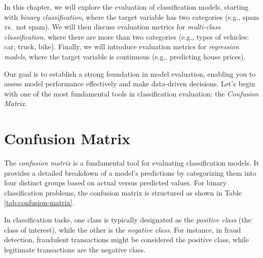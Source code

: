 \documentclass[
  11pt,
]{book}
\theoremstyle{definition}
\theoremstyle{definition}
\theoremstyle{definition}
\theoremstyle{definition}
\theoremstyle{remark}
\begin{document}
In this chapter, we will explore the evaluation of classification models, starting with \emph{binary classification}, where the target variable has two categories (e.g., spam vs.~not spam). We will then discuss evaluation metrics for \emph{multi-class classification}, where there are more than two categories (e.g., types of vehicles: car, truck, bike). Finally, we will introduce evaluation metrics for \emph{regression models}, where the target variable is continuous (e.g., predicting house prices).

Our goal is to establish a strong foundation in model evaluation, enabling you to assess model performance effectively and make data-driven decisions. Let's begin with one of the most fundamental tools in classification evaluation: the \emph{Confusion Matrix}.

\section{Confusion Matrix}\label{confusion-matrix}

The \emph{confusion matrix} is a fundamental tool for evaluating classification models. It provides a detailed breakdown of a model's predictions by categorizing them into four distinct groups based on actual versus predicted values. For binary classification problems, the confusion matrix is structured as shown in Table \ref{tab:confusion-matrix}.

In classification tasks, one class is typically designated as the \emph{positive class} (the class of interest), while the other is the \emph{negative class}. For instance, in fraud detection, fraudulent transactions might be considered the positive class, while legitimate transactions are the negative class.
\end{document}
